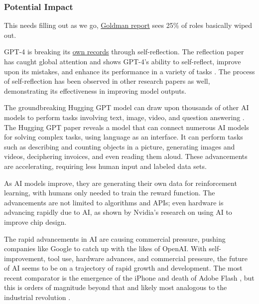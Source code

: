 \subsubsection{Potential Impact}
This needs filling out as we go, \href{https://www.key4biz.it/wp-content/uploads/2023/03/Global-Economics-Analyst_-The-Potentially-Large-Effects-of-Artificial-Intelligence-on-Economic-Growth-Briggs_Kodnani.pdf}{Goldman report} sees 25\% of roles basically wiped out.\par 
GPT-4 is breaking its \href{https://nanothoughts.substack.com/p/reflecting-on-reflexion}{own records} through self-reflection. The reflection paper has caught global attention and shows GPT-4's ability to self-reflect, improve upon its mistakes, and enhance its performance in a variety of tasks \cite{shinn2023reflexion}. The process of self-reflection has been observed in other research papers as well, demonstrating its effectiveness in improving model outputs.\par
The groundbreaking Hugging GPT model can draw upon thousands of other AI models to perform tasks involving text, image, video, and question answering \cite{shen2023hugginggpt}. The Hugging GPT paper reveals a model that can connect numerous AI models for solving complex tasks, using language as an interface. It can perform tasks such as describing and counting objects in a picture, generating images and videos, deciphering invoices, and even reading them aloud. These advancements are accelerating, requiring less human input and labeled data sets.\par
As AI models improve, they are generating their own data for reinforcement learning, with humans only needed to train the reward function. The advancements are not limited to algorithms and APIs; even hardware is advancing rapidly due to AI, as shown by Nvidia's research on using AI to improve chip design.\par
The rapid advancements in AI are causing commercial pressure, pushing companies like Google to catch up with the likes of OpenAI. With self-improvement, tool use, hardware advances, and commercial pressure, the future of AI seems to be on a trajectory of rapid growth and development. The most recent comparator is the emergence of the iPhone and death of Adobe Flash \cite{horton2019death}, but this is orders of magnitude beyond that and likely most analogous to the industrial revolution \cite{trajtenberg2018ai}. 
